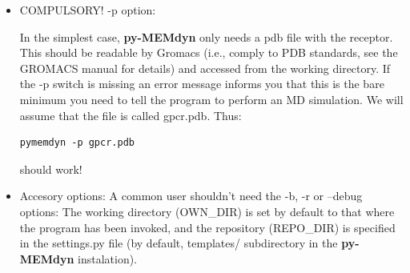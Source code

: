 \documentclass[10pt, oneside, pdftex]{article}
\begin{document}
\begin{itemize}
\item{COMPULSORY! -p option:

In the  simplest case, \textbf{py-MEMdyn}  only needs a pdb  file with
the receptor.  This should be readable by Gromacs (i.e., comply to PDB
standards, see the  GROMACS manual for details) and  accessed from the
working  directory. If  the  -p  switch is  missing  an error  message
informs you that this is the bare minimum you need to tell the program
to perform  an MD simulation. We  will assume that the  file is called
gpcr.pdb.  Thus:
\begin{Verbatim}
pymemdyn -p gpcr.pdb
\end{Verbatim}
  should work!}

\item{Accesory options: 
A common user shouldn't need the -b,
  -r or  --debug options: The  working directory (OWN\_DIR) is  set by
  default  to  that  where  the  program has  been  invoked,  and  the
  repository  (REPO\_DIR) is  specified  in the  settings.py file  (by
  default,   templates/   subdirectory   in   the   \textbf{py-MEMdyn}
  instalation).}
  

\end{itemize}
\end{document}
